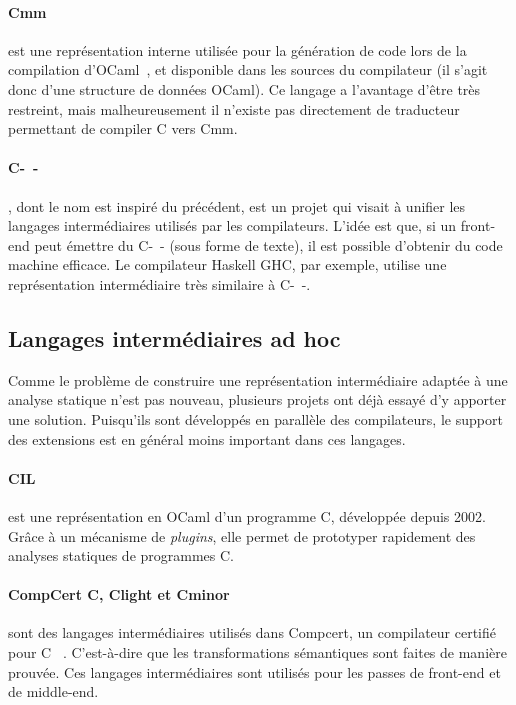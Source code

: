 \paragraph{Cmm} est une représentation interne utilisée pour la génération de
code lors de la compilation d'OCaml~\cite{ocamlManual,DAOC}, et disponible dans les sources
du compilateur (il s'agit donc d'une structure de données OCaml). Ce langage a
l'avantage d'être très restreint, mais malheureusement il n'existe pas
directement de traducteur permettant de compiler C vers Cmm.

\paragraph{C-~-}\cite{spjcmm} , dont le nom est inspiré du précédent,
est un projet qui visait à unifier les langages intermédiaires utilisés par les
compilateurs. L'idée est que, si un front-end peut émettre du C-~- (sous forme de
texte), il est possible d'obtenir du code machine efficace. Le compilateur
Haskell GHC, par exemple, utilise une représentation intermédiaire très
similaire à C-~-.

\subsection*{Langages intermédiaires ad hoc}

Comme le problème de construire une représentation intermédiaire adaptée à une
analyse statique n'est pas nouveau, plusieurs projets ont déjà essayé d'y
apporter une solution. Puisqu'ils sont développés en parallèle des compilateurs,
le support des extensions est en général moins important dans ces langages.

\paragraph{CIL}\cite{NeculaCil} est une représentation en OCaml d'un programme
C, développée depuis 2002. Grâce à un mécanisme de \emph{plugins}, elle permet de
prototyper rapidement des analyses statiques de programmes C.

\paragraph{CompCert C, Clight et Cminor} sont des langages intermédiaires
utilisés dans Compcert, un compilateur certifié pour C
~\cite{cfront,cminorSLfull}. C'est-à-dire que les transformations sémantiques
sont faites de manière prouvée. Ces langages intermédiaires sont utilisés pour
les passes de front-end et de middle-end.

